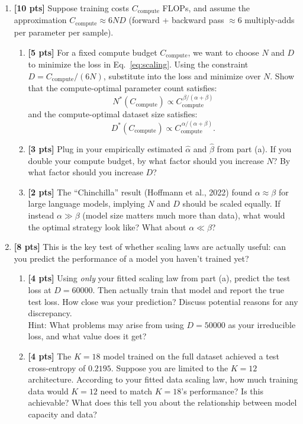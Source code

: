 \documentclass[submit]{harvardml}
\begin{document}
\begin{problem}
\begin{enumerate}[label=(\alph*)]
\item \textbf{[10 pts]} Suppose training costs $C_{\text{compute}}$ FLOPs, and assume the approximation $C_{\text{compute}} \approx 6ND$ (forward + backward pass $\approx 6$ multiply-adds per parameter per sample).
\begin{enumerate}[label=(\roman*)]
    \item \textbf{[5 pts]} For a fixed compute budget $C_{\text{compute}}$, we want to choose $N$ and $D$ to minimize the loss in Eq.~\eqref{eq:scaling}. Using the constraint $D = C_{\text{compute}} / (6N)$, substitute into the loss and minimize over $N$. Show that the compute-optimal parameter count satisfies:
    $$
    N^*(C_{\text{compute}}) \propto C_{\text{compute}}^{\,\beta / (\alpha + \beta)}
    $$
    and the compute-optimal dataset size satisfies:
    $$
    D^*(C_{\text{compute}}) \propto C_{\text{compute}}^{\,\alpha / (\alpha + \beta)}.
    $$
    \item \textbf{[3 pts]} Plug in your empirically estimated $\hat{\alpha}$ and $\hat{\beta}$ from part (a). If you double your compute budget, by what factor should you increase $N$? By what factor should you increase $D$?
    \item \textbf{[2 pts]} The ``Chinchilla'' result (Hoffmann et al., 2022) found $\alpha \approx \beta$ for large language models, implying $N$ and $D$ should be scaled equally. If instead $\alpha \gg \beta$ (model size matters much more than data), what would the optimal strategy look like? What about $\alpha \ll \beta$?
\end{enumerate}
\item \textbf{[8 pts]} This is the key test of whether scaling laws are actually useful: can you predict the performance of a model you haven't trained yet?
\begin{enumerate}[label=(\roman*)]
    \item \textbf{[4 pts]} Using \emph{only} your fitted scaling law from part (a), predict the test loss at $D = 60000$. Then actually train that model and report the true test loss.
    How close was your prediction? Discuss potential reasons for any discrepancy. \\
    Hint: What problems may arise from using $D=50000$ as your irreducible loss, and what value does it get?
    \item \textbf{[4 pts]} The $K=18$ model trained on the full dataset achieved a test cross-entropy of $0.2195$. Suppose you are limited to the $K=12$ architecture. According to your fitted data scaling law, how much training data would $K=12$ need to match $K=18$'s performance? Is this achievable? What does this tell you about the relationship between model capacity and data?
\end{enumerate}
\end{enumerate}

\end{problem}
\end{document}

